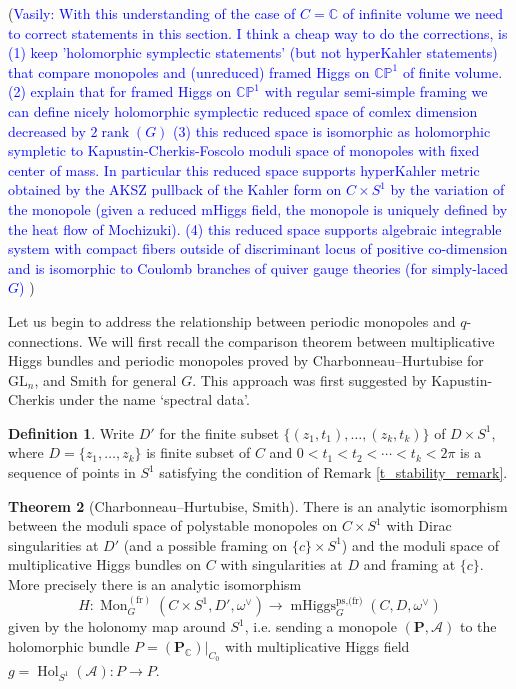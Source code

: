 \documentclass[11pt, oneside, reqno]{amsart}
\theoremstyle{definition} \newtheorem{definition}{Definition}[section]
\newtheorem{theorem}[definition]{Theorem}
\theoremstyle{definition} \newtheorem{remark}[definition]{Remark}
\theoremstyle{definition} \newtheorem{remarks}[definition]{Remarks}
\theoremstyle{definition} \newtheorem{question}[definition]{Question}
\theoremstyle{definition} \newtheorem*{note}{Note}
\theoremstyle{definition} \newtheorem{example}[definition]{Example}
\theoremstyle{definition} \newtheorem{examples}[definition]{Examples}
\newcommand{\mc}[1]{\mathcal{#1}}
\newcommand{\bo}[1]{\boldsymbol{#1}}
\newcommand{\CC}{\mathbb{C}}
\newcommand{\GL}{\mathrm{GL}}
\DeclareMathOperator{\rank}{rank}
\DeclareMathOperator{\mhiggs}{mHiggs}
\DeclareMathOperator{\mon}{Mon}
\DeclareMathOperator{\Hol}{Hol}
\newcommand{\fr}{\mathrm{fr}}
\newcommand{\vasily}[1]{(\textcolor{blue}{Vasily: #1})}
\begin{document}
\vasily{With this understanding of the case of $C = \mathbb{C}$ of infinite volume
  we need to correct statements in this section.
  I think a cheap way to do the corrections, is (1) keep 'holomorphic
  symplectic statements' (but not hyperKahler statements) 
  that compare monopoles and (unreduced) framed Higgs on $\mathbb{CP}^1$
  of finite volume. (2) explain that for framed Higgs on $\mathbb{CP}^1$
  with regular semi-simple framing
  we can define nicely holomorphic symplectic reduced space
  of comlex dimension decreased by $2 \rank(G)$
  (3) this reduced space is isomorphic as holomorphic sympletic
  to Kapustin-Cherkis-Foscolo moduli space of monopoles
  with fixed center of mass. In particular this reduced
  space supports hyperKahler metric obtained by
  the AKSZ pullback of the Kahler form on $C \times S^1$
  by the variation of the monopole (given
  a reduced mHiggs field,  the monopole is uniquely defined
   by the heat flow of Mochizuki). 
  (4) this reduced space supports algebraic integrable system with
  compact fibers outside of discriminant locus of positive co-dimension
  and is isomorphic to Coulomb branches of quiver gauge theories
  (for simply-laced $G$)
 }


Let us begin to address the relationship between periodic monopoles and $q$-connections.  We will first recall the comparison theorem between multiplicative Higgs bundles and periodic monopoles proved by Charbonneau--Hurtubise \cite{CharbonneauHurtubise} for $\GL_n$, and Smith \cite{Smith} for general $G$. This approach was first suggested by Kapustin-Cherkis \cite{CherkisKapustin2} under the name `spectral data'. 

\begin{definition}
Write $D'$ for the finite subset $\{(z_1,t_1), \ldots, (z_k, t_k)\}$ of $D \times S^1$, where $D = \{z_1, \ldots, z_k\}$ is finite subset of $C$ and $0 < t_1 < t_2 < \cdots < t_k < 2\pi$ is a sequence of points in $S^1$ satisfying the condition of Remark \ref{t_stability_remark}.
\end{definition}

\begin{theorem}[Charbonneau--Hurtubise, Smith] \label{CHS_thm}
There is an analytic isomorphism between the moduli space of polystable monopoles on $C \times S^1$ with Dirac singularities at $D'$ (and a possible framing on $\{c\} \times S^1$) and the moduli space of multiplicative Higgs bundles on $C$ with singularities at $D$ and framing at $\{c\}$.  More precisely there is an analytic isomorphism
\[H \colon \mon^{(\fr)}_G(C \times S^1, D', \omega^\vee) \to \mhiggs_G^{\text{ps,(fr)}}(C, D, \omega^\vee)\]
given by the holonomy map around $S^1$, i.e. sending a monopole $(\bo P, \mc A)$ to the holomorphic bundle $P = (\bo P_\CC)|_{C_0}$ with multiplicative Higgs field $g = \Hol_{S^1}(\mc A) \colon P \to P$.
\end{theorem}
\end{document}
